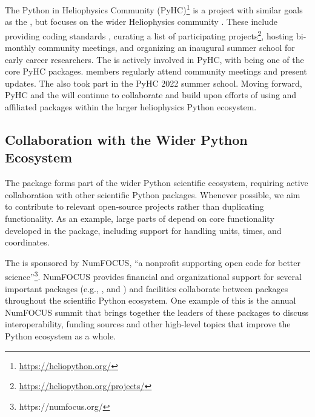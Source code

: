 The Python in Heliophysics Community (PyHC)\footnote{\url{https://heliopython.org/}} \citep{barnum2022python} is a project with similar goals as the \sunpyproj, but focuses on the wider Heliophysics community \citep{https://doi.org/10.1029/2018JA025877}.
These include providing coding standards \citep{annex_a_2018_2529131}, curating a list of participating projects\footnote{\url{https://heliopython.org/projects/}}, hosting bi-monthly community meetings, and organizing an inaugural summer school for early career researchers.
The \sunpyproj is actively involved in PyHC, with \sunpypkg being one of the core PyHC packages.
\sunpyproj members regularly attend community meetings and present updates.
The \sunpyproj also took part in the PyHC 2022 summer school.
Moving forward, PyHC and the \sunpyproj will continue to collaborate and build upon efforts of using \sunpypkg and affiliated packages within the larger heliophysics Python ecosystem.

\subsection{Collaboration with the Wider Python Ecosystem}
\label{ssec:collaboration-with-the-wider-python-ecosystem}

The \sunpypkg package forms part of the wider Python scientific ecosystem, requiring active collaboration with other scientific Python packages.
Whenever possible, we aim to contribute to relevant open-source projects rather than duplicating functionality.
As an example, large parts of \sunpypkg depend on core functionality developed in the \astropypkg package, including support for handling units, times, and coordinates.

The \sunpyproj is sponsored by NumFOCUS, \enquote{a nonprofit supporting open code for better science}\footnote{https://numfocus.org/}.
NumFOCUS provides financial and organizational support for several important packages (e.g., ,  and ) and facilities collaborate between packages throughout the scientific Python ecosystem.
One example of this is the annual NumFOCUS summit that brings together the leaders of these packages to discuss interoperability, funding sources and other high-level topics that improve the Python ecosystem as a whole.

